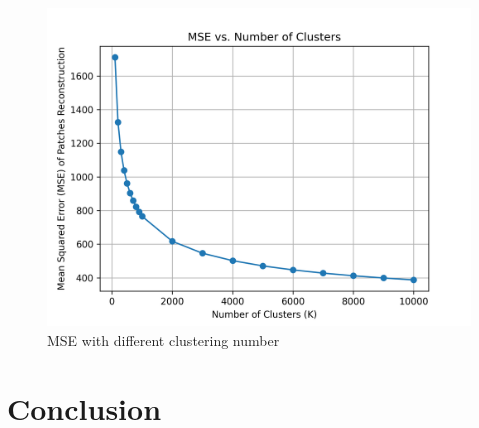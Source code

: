 \documentclass{article}
\begin{document}
\begin{figure}[htbp!]
    \centering
    \includegraphics[width = 0.6 \textwidth]{K-means/Result/Patches/MSE_vs_K.png}
    \caption{MSE with different clustering number}
    \label{fig:enter-label}
\end{figure}
\section{Conclusion}


\printbibliography
\end{document}
